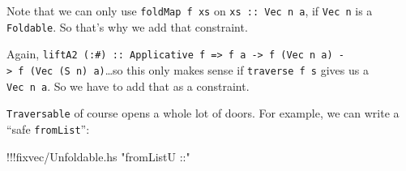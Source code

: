 \documentclass[]{article}
\newenvironment{Shaded}{}{}
\newcommand{\DataTypeTok}[1]{\textcolor[rgb]{0.56,0.13,0.00}{{#1}}}
\newcommand{\DecValTok}[1]{\textcolor[rgb]{0.25,0.63,0.44}{{#1}}}
\newcommand{\StringTok}[1]{\textcolor[rgb]{0.25,0.44,0.63}{{#1}}}
\newcommand{\FunctionTok}[1]{\textcolor[rgb]{0.02,0.16,0.49}{{#1}}}
\newcommand{\NormalTok}[1]{{#1}}
\begin{document}
Note that we can only use \texttt{foldMap\ f\ xs} on
\texttt{xs\ ::\ Vec\ n\ a}, if \texttt{Vec\ n} is a \texttt{Foldable}.
So that's why we add that constraint.

Again,
\texttt{liftA2\ (:\#)\ ::\ Applicative\ f\ =\textgreater{}\ f\ a\ -\textgreater{}\ f\ (Vec\ n\ a)\ -\textgreater{}\ f\ (Vec\ (S\ n)\ a)}\ldots{}so
this only makes sense if \texttt{traverse\ f\ s} gives us a
\texttt{Vec\ n\ a}. So we have to add that as a constraint.

\begin{Shaded}
\end{Shaded}

\texttt{Traversable} of course opens a whole lot of doors. For example,
we can write a ``safe \texttt{fromList}'':

\begin{Shaded}
\begin{Highlighting}[]
\FunctionTok{!!!}\NormalTok{fixvec}\FunctionTok{/}\NormalTok{Unfoldable.hs }\StringTok{"fromListU ::"}
\end{Highlighting}
\end{Shaded}
\end{document}
